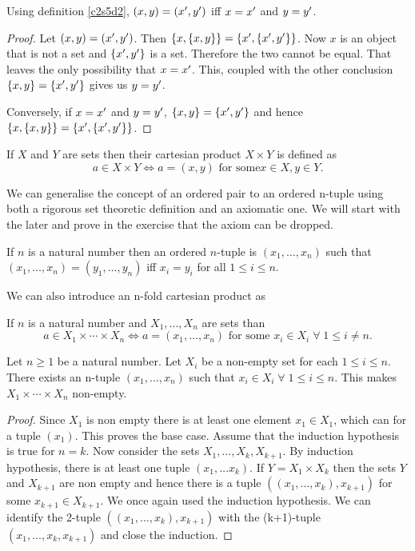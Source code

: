 \begin{lem}\label{c2s5l4}
Using definition \ref{c2s5d2}, $(x, y) = (x^\prime, y^\prime)$ iff $x = x^\prime$
and $y = y^\prime$.
\end{lem}
\begin{proof}
Let $(x, y) = (x^\prime, y^\prime)$. Then $\{x, \{x, y\}\} = \{x^\prime, \{x^\prime,
y^\prime\}\}$. Now $x$ is an object that is not a set and $\{x^\prime, y^\prime\}$ 
is a set. Therefore the two cannot be equal. That leaves the only 
possibility that $x = x^\prime$. This, coupled with the other conclusion
$\{x, y\} = \{x^\prime, y^\prime\}$ gives us $y = y^\prime$.

Conversely, if $x = x^\prime$ and $y = y^\prime$, $\{x, y\} = \{x^\prime, y^\prime\}$
and hence $\{x, \{x, y\}\} = \{x^\prime, \{x^\prime, y^\prime\}\}$.
\end{proof}

\begin{defn}\label{c2d5d3}
If $X$ and $Y$ are sets then their cartesian product $X \times Y$ is 
defined as 
\[
a \in X \times Y \Leftrightarrow a = (x, y) \text{ for some} x \in X,
y \in Y.
\]
\end{defn}

We can generalise the concept of an ordered pair to an ordered n-tuple
using both a rigorous set theoretic definition and an axiomatic one. We
will start with the later and prove in the exercise that the axiom can 
be dropped.
\begin{defn}\label{c2s5d4}
If $n$ is a natural number then an ordered $n$-tuple is $(x_1, \ldots,
x_n)$ such that $(x_1, \ldots, x_n) = (y_1, \ldots, y_n)$ iff $x_i = y_i$
for all $1 \le i \le n$.
\end{defn}

We can also introduce an n-fold cartesian product as 
\begin{defn}\label{c2s5d5}
If $n$ is a natural number and $X_1, \ldots, X_n$ are sets than
\[
a \in X_1 \times \cdots \times X_n \Leftrightarrow a = (x_1, \ldots, x_n)
\text{ for some } x_i \in X_i \;\forall\; 1 \le i \ne n.
\]
\end{defn}

\begin{lem}\label{c2s5l5}
Let $n \ge 1$ be a natural number. Let $X_i$ be a non-empty set for each
$1 \le i \le n$. There exists an n-tuple $(x_1, \ldots, x_n)$ such that
$x_i \in X_i \;\forall\; 1 \le i \le n$. This makes $X_1 \times \cdots
\times X_n$ non-empty.
\end{lem}
\begin{proof}
Since $X_1$ is non empty there is at least one element $x_1 \in X_1$,
which can for a tuple $(x_1)$. This proves the base case. Assume that the
induction hypothesis is true for $n = k$. Now consider the sets $X_1, 
\ldots, X_k, X_{k+1}$. By induction hypothesis, there is at least one
tuple $(x_1, \ldots x_k)$. If $Y = X_1 \times X_k$ then the sets $Y$ and
$X_{k+1}$ are non empty and hence there is a tuple $((x_1, \ldots, x_k),
x_{k+1})$ for some $x_{k+1} \in X_{k+1}$. We once again used the induction
hypothesis. We can identify the 2-tuple $((x_1, \ldots, x_k), x_{k+1})$
with the (k+1)-tuple $(x_1, \ldots, x_k, x_{k+1})$ and close the induction.
\end{proof}

